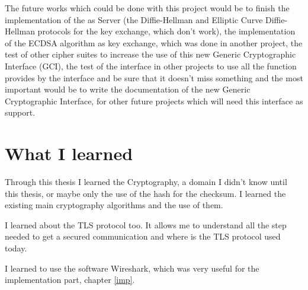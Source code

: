The future works which could be done with this project would be to finish the
implementation of the \embtls as Server (the Diffie-Hellman and Elliptic Curve
Diffie-Hellman protocols for the key exchange, which don't work), the
implementation of the ECDSA algorithm as key exchange, which was done in another
project, the test of other cipher suites to increase the use of this new Generic
Cryptographic Interface (GCI), the test of the interface in other projects to
use all the function provides by the interface and be sure that it doesn't miss
something and the most important would be to write the documentation of the new
Generic Cryptographic Interface, for other future projects which will need this
interface as support.

\section{What I learned}
Through this thesis I learned the Cryptography, a domain I didn't know until
this thesis, or maybe only the use of the hash for the checksum. I learned the
existing main cryptography algorithms and the use of them.

I learned about the TLS protocol too. It allows me to understand all the step
needed to get a secured communication and where is the TLS protocol used today.

I learned to use the software Wireshark, which was very useful for the
implementation part, chapter \ref{imp}.
